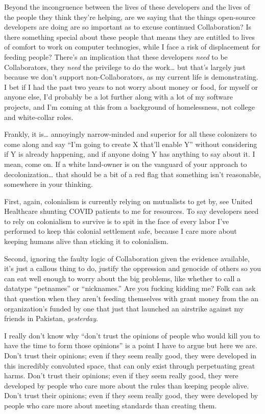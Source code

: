 \documentclass[11pt]{article}
\begin{document}
\begin{itemize}
Beyond the incongruence between the lives of these developers and the lives of the people they think they’re helping, are we saying that the things open-source developers are doing are so important as to excuse continued Collaboration? Is there something special about these people that means they are entitled to lives of comfort to work on computer technogies, while I face a risk of displacement for feeding people? There’s an implication that these developers \emph{need} to be Collaborators, they \emph{need} the privilege to do the work… but that’s largely just because we don’t support non-Collaborators, as my current life is demonstrating. I bet if I had the past two years to not worry about money or food, for myself or anyone else, I’d probably be a lot further along with a lot of my software projects, and I’m coming at this from a background of homelessness, not college and white-collar roles.

Frankly, it is… annoyingly narrow-minded and superior for all these colonizers to come along and say “I’m going to create X that’ll enable Y” without considering if Y is already happening, and if anyone doing Y has anything to say about it. I mean, come on. If a white land-owner is on the vanguard of your approach to decolonization… that should be a bit of a red flag that something isn’t reasonable, somewhere in your thinking.

First, again, colonialism is currently relying on mutualists to get by, see United Healthcare shunting COVID patients to me for resources. To say developers need to rely on colonialism to survive is to spit in the face of every labor I’ve performed to keep this colonial settlement safe, because I care more about keeping humans alive than sticking it to colonialism.

Second, ignoring the faulty logic of Collaboration given the evidence available, it’s just a callous thing to do, justify the oppression and genocide of others so you can eat well enough to worry about the big problems, like whether to call a datatype  “petnames” or “nicknames.” Are you fucking kidding me? Folk can ask that question when they aren’t feeding themselves with grant money from the an organization’s funded by one that just that launched an airstrike against my friends in Pakistan, \emph{yesterday}.

I really don’t know why “don’t trust the opinions of people who would kill you to have the time to form those opinions” is a point I have to argue but here we are. Don’t trust their opinions; even if they seem really good, they were developed in this incredibly convoluted space, that can only exist through perpetuating great harms. Don’t trust their opinions; even if they seem really good, they were developed by people who care more about the rules than keeping people alive. Don’t trust their opinions; even if they seem really good, they were developed by people who care more about meeting standards than creating them.


\end{itemize}
\end{document}
